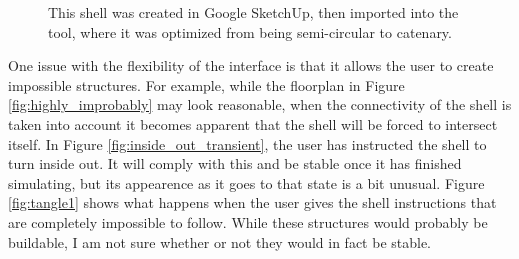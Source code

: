 \documentclass{thesis}
\begin{document}
\begin{figure}
\caption[A loaded mesh]{This shell was created in Google SketchUp, then imported into the tool, where it was optimized
from being semi-circular to catenary.}
\label{fig:triangle_mesh}
\end{figure}

One issue with the flexibility of the interface is that it allows the user to create impossible structures.  For example,
while the floorplan in Figure \ref{fig:highly_improbably} may look reasonable, when the connectivity of the shell is taken into
account it becomes apparent that the shell will be forced to intersect itself.  In Figure \ref{fig:inside_out_transient}, the
user has instructed the shell to turn inside out.  It will comply with this and be stable once it has finished simulating, but
its appearence as it goes to that state is a bit unusual.  Figure \ref{fig:tangle1} shows what happens when the user gives the
shell instructions that are completely impossible to follow.  While these structures would probably be buildable, I am not sure
whether or not they would in fact be stable.
\end{document}
